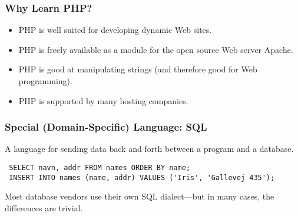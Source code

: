 \documentclass[dvipsnames]{beamer}
\begin{document}
\begin{frame}
  \frametitle{Why Learn PHP?}

  \begin{itemize}
  \item PHP is well suited for developing dynamic Web sites.
    
  \item PHP is freely available as a module for the open source Web
    server Apache.
    
  \item PHP is good at manipulating strings (and therefore good for
    Web programming).
    
  \item PHP is supported by many hosting companies.  
\end{itemize}
\end{frame}


\begin{frame}[fragile]
  \frametitle{Special (Domain-Specific) Language: SQL}

 A language for sending data back and forth between a
program and a database.
\begin{footnotesize}
\begin{verbatim}
 SELECT navn, addr FROM names ORDER BY name;
 INSERT INTO names (name, addr) VALUES ('Iris', 'Gallevej 435');
\end{verbatim}
\end{footnotesize}
Most database vendors use their own SQL dialect---but in many cases, the
differences are trivial.

\end{frame}
\end{document}
